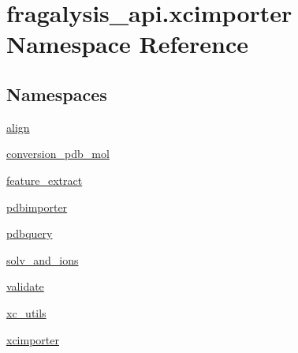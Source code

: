 \hypertarget{namespacefragalysis__api_1_1xcimporter}{}\section{fragalysis\+\_\+api.\+xcimporter Namespace Reference}
\label{namespacefragalysis__api_1_1xcimporter}
\subsection*{Namespaces}
\begin{DoxyCompactItemize}
\item 
 \hyperlink{namespacefragalysis__api_1_1xcimporter_1_1align}{align}
\item 
 \hyperlink{namespacefragalysis__api_1_1xcimporter_1_1conversion__pdb__mol}{conversion\+\_\+pdb\+\_\+mol}
\item 
 \hyperlink{namespacefragalysis__api_1_1xcimporter_1_1feature__extract}{feature\+\_\+extract}
\item 
 \hyperlink{namespacefragalysis__api_1_1xcimporter_1_1pdbimporter}{pdbimporter}
\item 
 \hyperlink{namespacefragalysis__api_1_1xcimporter_1_1pdbquery}{pdbquery}
\item 
 \hyperlink{namespacefragalysis__api_1_1xcimporter_1_1solv__and__ions}{solv\+\_\+and\+\_\+ions}
\item 
 \hyperlink{namespacefragalysis__api_1_1xcimporter_1_1validate}{validate}
\item 
 \hyperlink{namespacefragalysis__api_1_1xcimporter_1_1xc__utils}{xc\+\_\+utils}
\item 
 \hyperlink{namespacefragalysis__api_1_1xcimporter_1_1xcimporter}{xcimporter}
\end{DoxyCompactItemize}
